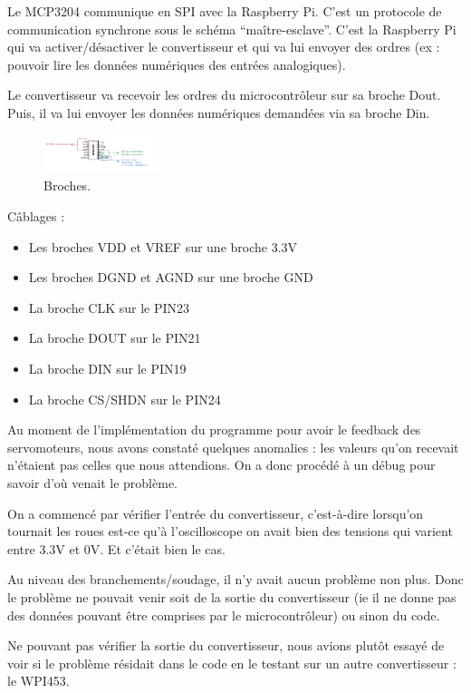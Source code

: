 \documentclass[a4paper,12pt]{report}  %
\begin{document}
Le MCP3204 communique en SPI avec la Raspberry Pi. C’est un protocole de communication synchrone sous le schéma “maître-esclave”. C’est la Raspberry Pi qui va activer/désactiver le convertisseur et qui va lui envoyer des ordres (ex : pouvoir lire les données numériques des entrées analogiques). 

Le convertisseur va recevoir les ordres du microcontrôleur sur sa broche Dout. Puis, il va lui envoyer les données numériques demandées via sa broche Din. 

\begin{figure}[H]
	\centering
	\includegraphics[width=0.3\textwidth]{./attachments/broches.png}
	\caption{Broches.}
\end{figure}

Câblages : 

\begin{itemize}
	\item Les broches VDD et VREF sur une broche 3.3V
	\item Les broches DGND et AGND sur une broche GND
	\item La broche CLK sur le PIN23
	\item La broche DOUT sur le PIN21
	\item La broche DIN sur le PIN19
	\item La broche CS/SHDN sur le PIN24
\end{itemize}

Au moment de l’implémentation du programme pour avoir le feedback des servomoteurs, nous avons constaté quelques anomalies : les valeurs qu’on recevait n’étaient pas celles que nous attendions. On a donc procédé à un débug pour savoir d’où venait le problème. 

On a commencé par vérifier l’entrée du convertisseur, c’est-à-dire lorsqu’on tournait les roues est-ce qu’à l’oscilloscope on avait bien des tensions qui varient entre 3.3V et 0V. Et c’était bien le cas. 

Au niveau des branchements/soudage, il n’y avait aucun problème non plus. Donc le problème ne pouvait venir soit de la sortie du convertisseur (ie il ne donne pas des données pouvant être comprises par le microcontrôleur) ou sinon du code. 

Ne pouvant pas vérifier la sortie du convertisseur, nous avions plutôt essayé de voir si le problème résidait dans le code en le testant sur un autre convertisseur : le WPI453. 
\end{document}
